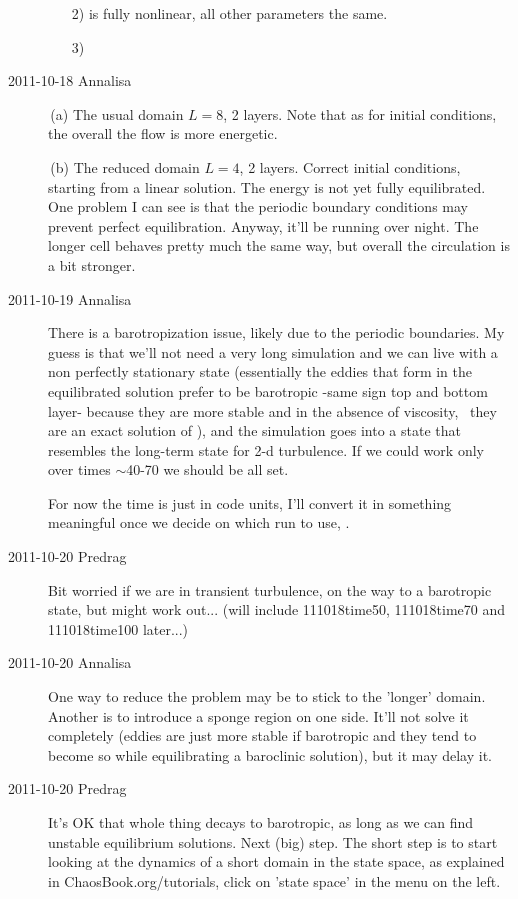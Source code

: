 \begin{description}
\begin{enumerate}
  \item [2)] is fully nonlinear, all other parameters the same.

  \item [3)]
\end{enumerate}

\item[2011-10-18 Annalisa]

\,(a)
The usual domain $L=8$, 2 layers. Note that as
for initial conditions, the overall the flow is more energetic.

\,(b)
The reduced domain $L=4$, 2 layers. Correct initial conditions, starting
from a linear solution. The energy is not yet fully equilibrated. One
problem I can see is that the periodic boundary conditions may prevent
perfect equilibration. Anyway, it'll be running over night. The longer
cell  behaves pretty much the same way, but overall
the circulation is a bit stronger.

\item[2011-10-19 Annalisa]
There is a barotropization issue, likely due to the periodic boundaries.
My guess is that we'll not need a very long simulation and we can live
with a non perfectly stationary state (essentially the eddies that form
in the equilibrated solution prefer to be barotropic -same sign top and
bottom layer- because they are more stable and in the absence of
viscosity, \etc\ they are an exact solution of \NS), and the simulation goes
into a state that resembles the long-term state for 2-d turbulence. If we
could work only over times $\sim $40-70 we should be all set.

For now the time
is just in code units, I'll convert it in something meaningful once we
decide on which run to use, \etc.

\item[2011-10-20 Predrag]
Bit worried if we are in transient turbulence, on the way to a
barotropic state, but might work out... (will include 111018time50,
111018time70 and 111018time100 later...)

\item[2011-10-20 Annalisa]
One way to reduce the problem may be to stick to the 'longer' domain.
Another is to introduce a sponge region on one side. It'll not solve it
completely (eddies are just more stable if barotropic and they tend to
become so while equilibrating a baroclinic solution), but it may delay
it.

\item[2011-10-20 Predrag]
It's OK that whole thing decays to barotropic, as long as we can find
unstable equilibrium solutions. Next (big) step. The short step is
to start looking at the dynamics of a short domain in the state space,
as explained in ChaosBook.org/tutorials, click on 'state space' in the
menu on the left.


\end{description}

